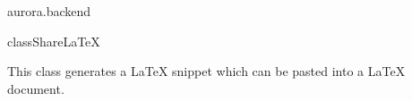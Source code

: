\begin{texdocpackage}{aurora.backend}
\begin{texdocclass}{class}{ShareLaTeX}{}{}
\label{texdoclet:aurora.backend.ShareLaTeX}
\begin{texdocclassintro}
This class generates a LaTeX snippet which can be pasted into a LaTeX document.\end{texdocclassintro}
\begin{texdocclassconstructors}
\end{texdocclassconstructors}
\begin{texdocclassmethods}
\end{texdocclassmethods}
\end{texdocclass}



\end{texdocpackage}
